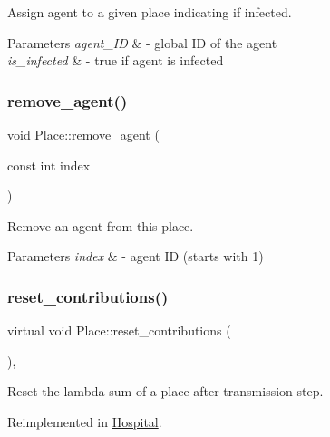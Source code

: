 Assign agent to a given place indicating if infected. 


\begin{DoxyParams}{Parameters}
{\em agent\+\_\+\+ID} & -\/ global ID of the agent \\
\hline
{\em is\+\_\+infected} & -\/ true if agent is infected \\
\hline
\end{DoxyParams}
\mbox{\label{classPlace_aee19c9f59dcaeb02ac3b1e9c8adaa784}} 
\subsubsection{\texorpdfstring{remove\+\_\+agent()}{remove\_agent()}}
{\footnotesize\ttfamily void Place\+::remove\+\_\+agent (\begin{DoxyParamCaption}\item[{const int}]{index }\end{DoxyParamCaption})}



Remove an agent from this place. 


\begin{DoxyParams}{Parameters}
{\em index} & -\/ agent ID (starts with 1) \\
\hline
\end{DoxyParams}
\mbox{\label{classPlace_abc1e560ef8aaaad565ccceb9540e5bd8}} 
\subsubsection{\texorpdfstring{reset\+\_\+contributions()}{reset\_contributions()}}
{\footnotesize\ttfamily virtual void Place\+::reset\+\_\+contributions (\begin{DoxyParamCaption}{ }\end{DoxyParamCaption})\hspace{0.3cm}{\ttfamily [inline]}, {\ttfamily [virtual]}}



Reset the lambda sum of a place after transmission step. 



Reimplemented in \hyperlink{classHospital_a928d185dde78d0bce3034b7a138b472d}{Hospital}.



